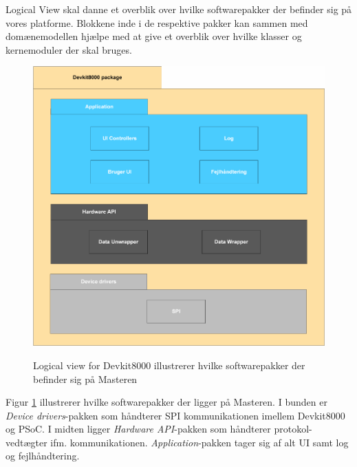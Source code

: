 
Logical View skal danne et overblik over hvilke softwarepakker der befinder sig på vores platforme. Blokkene inde i de respektive pakker kan sammen med domænemodellen hjælpe med at give et overblik over hvilke klasser og kernemoduler der skal bruges.

\begin{figure}[htbp] \centering
{\includegraphics[scale=0.7]{filer/systemarkitektur/logical_view_devkit}}
\caption{Logical view for Devkit8000 illustrerer hvilke softwarepakker der befinder sig på Masteren }
\label{fig:Logical View Devkit8000}
\end{figure}

Figur \ref{fig:Logical View Devkit8000} illustrerer hvilke softwarepakker der ligger på Masteren. I bunden er \textit{Device drivers}-pakken som håndterer SPI kommunikationen imellem Devkit8000 og PSoC. I midten ligger \textit{Hardware API}-pakken som håndterer protokol-vedtægter ifm. kommunikationen. \textit{Application}-pakken tager sig af alt UI samt log og fejlhåndtering.

\clearpage

